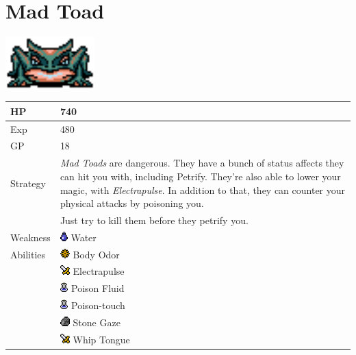 \section{Mad Toad}
\label{monster:mad_toad}

\includegraphics[height=2cm,keepaspectratio]{./resources/monster/mad_toad}

\begin{longtable}{ l p{9cm} }
	HP
	& 740
\\ \hline
	Exp
	& 480
\\ \hline
	GP
	& 18
\\ \hline
	Strategy
	& \textit{Mad Toads} are dangerous. They have a bunch of status affects they can hit you with, including Petrify. They're also able to lower your magic, with \textit{Electrapulse}. In addition to that, they can counter your physical attacks by poisoning you. \\
	& Just try to kill them before they petrify you.
\\ \hline
	Weakness
	& \includegraphics[height=1em,keepaspectratio]{./resources/effects/water} Water
\\ \hline
	Abilities
	& \includegraphics[height=1em,keepaspectratio]{./resources/effects/paralyze} Body Odor \\
	& \includegraphics[height=1em,keepaspectratio]{./resources/effects/damage} Electrapulse \\
	& \includegraphics[height=1em,keepaspectratio]{./resources/effects/poison} Poison Fluid \\
	& \includegraphics[height=1em,keepaspectratio]{./resources/effects/poison} Poison-touch \\
	& \includegraphics[height=1em,keepaspectratio]{./resources/effects/petrify} Stone Gaze \\
	& \includegraphics[height=1em,keepaspectratio]{./resources/effects/damage} Whip Tongue
\end{longtable}

